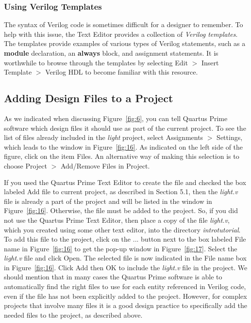\subsubsection{Using Verilog Templates}

The syntax of Verilog code is sometimes difficult for a
designer to remember. To help with this issue, the Text Editor
provides a collection of {\it Verilog templates}. The templates provide
examples of various types of Verilog statements, such as a {\bf module}
declaration, an {\bf always} block, and assignment statements. 
It is worthwhile to browse through the templates
by selecting {\sf Edit $>$ Insert Template $>$ Verilog HDL} to become 
familiar with this resource.

\subsection{Adding Design Files to a Project}

As we indicated when discussing Figure~\ref{fig:6}, you can tell Quartus Prime software
which design files it should use as part of the current project.
To see the list of files already included in the {\it light} project,
select {\sf Assignments $>$ Settings}, which leads to the window in Figure~\ref{fig:16}.
As indicated on the left side of the figure, click on the item {\sf Files}.
An alternative way of making this selection is to choose
{\sf Project $>$ Add/Remove Files in Project}.

If you used the Quartus Prime Text Editor to create the file and checked
the box labeled {\sf Add file to current project},
as described in Section 5.1, then the {\it light.v}
file is already a part of the project and will be listed in
the window in Figure~\ref{fig:16}.
Otherwise, the file must be added to the project. 
So, if you did not use the Quartus Prime Text Editor, then place a copy of the 
file {\it light.v}, which you created using some other text editor, into 
the directory {\it introtutorial}.
To add this file to the project, click on the {\sf ...} button next to the 
box labeled {\sf File name} in
Figure~\ref{fig:16} to get the pop-up window in Figure~\ref{fig:17}.
Select the {\it light.v} file and click {\sf Open}.
The selected file is now indicated in the {\sf File name} box in Figure~\ref{fig:16}. 
Click {\sf Add} then {\sf OK} to include the {\it light.v} file in the project.
We should mention that in many cases the Quartus Prime software is able to 
automatically find the right files to use for each entity 
referenced in Verilog code, even if the file has not been 
explicitly added to the project. However, for complex projects that
involve many files it is a good design practice to specifically
add the needed files to the project, as described above.

